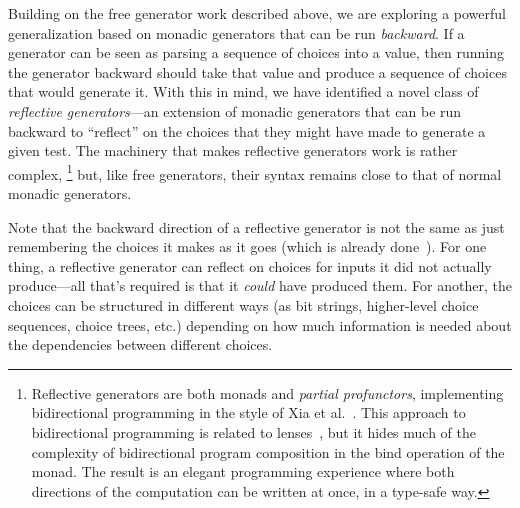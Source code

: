 
\iflater
{}
%
\fi
Building on the free generator work described above, we are exploring
a powerful generalization based on
monadic generators that can be run {\em backward}.
%
If a generator can be seen as parsing a sequence of choices into a
value, then running the
generator backward should take that value and produce a sequence of choices that
would generate it.  With this in mind, we have identified a
novel class of {\em reflective
generators}---an extension of monadic generators that can be run backward to
``reflect'' on the choices that they might have made to generate a
given test. The machinery
that makes reflective generators work is rather complex,%
\footnote{\normalsize Reflective generators are both monads and {\em
    partial profunctors},
implementing bidirectional programming in the style of Xia et
al.~\cite{xia2019composing}. This approach to bidirectional programming is
related to lenses~\cite{foster2009bidirectional}, but it hides much of the
complexity of bidirectional program composition in the bind operation of the
monad. The result is an elegant programming experience where both directions of
the computation can be written at once, in a type-safe way.}
but, like free generators, their syntax remains close to that of normal
monadic generators.

Note that the backward direction of a reflective generator is not the
same as just remembering the choices it makes as it goes (which is
already done~\cite{maciver2019hypothesis,
  hatfield-dodds_hypofuzz_nodate}). For one thing, a reflective
generator can reflect on choices for inputs it did not actually
produce---all that's required is that it {\em could} have produced
them.  For another, the choices can be structured in different ways (as bit
strings, higher-level choice sequences, choice trees, etc.) depending
on how much information is needed about the dependencies between different
choices.

